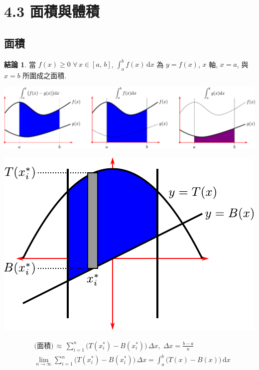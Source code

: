 \documentclass[12pt]{extarticle}
\newcommand{\ds}{\displaystyle}
\theoremstyle{definition}
\newtheorem*{fact}{結論}
\begin{document}
\section*{4.3 面積與體積}
\subsection*{面積}
\begin{fact}
  \begin{minipage}{\textwidth}
    當 $f(x)\geqslant 0$ $\forall\,x\in [a,\,b]$, $\ds\int_a^b\!f(x)\,\text{d}x$ 為 $y = f(x)$, $x$ 軸, $x = a$, 與 $x = b$ 所圍成之面積. 
  \end{minipage}
  \begin{minipage}{\textwidth}
    \begin{center}
      \includegraphics[width=.9\textwidth]{area_between2}
    \end{center}
  \end{minipage}
  \begin{minipage}{.42\textwidth}
    \begin{center}
      \includegraphics[scale=.7]{area_between4}
    \end{center}
  \end{minipage}
  \begin{minipage}{.58\textwidth}
    \begin{align*}
      &\text{(面積)} \,\approx\,\sum_{i=1}^n\big(T(x_i^*) - B(x_i^*)\big)\,\Delta x,\;\Delta x = \frac{b - a}{n} \\
      &\lim_{n\to\infty}\sum_{i=1}^n \big(T(x_i^*)- B(x_i^*)\big)\,\Delta x = \int_a^b \big(T(x) - B(x)\big)\,\text{d}x
    \end{align*}
  \end{minipage}
\end{fact}
\end{document}
